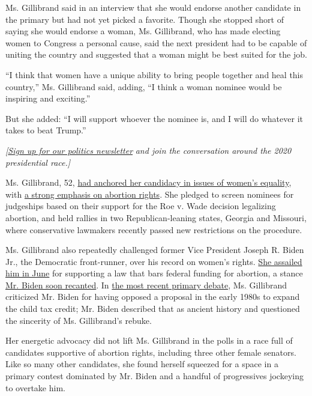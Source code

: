 Ms. Gillibrand said in an interview that she would endorse another
candidate in the primary but had not yet picked a favorite. Though she
stopped short of saying she would endorse a woman, Ms. Gillibrand, who
has made electing women to Congress a personal cause, said the next
president had to be capable of uniting the country and suggested that a
woman might be best suited for the job.

``I think that women have a unique ability to bring people together and
heal this country,'' Ms. Gillibrand said, adding, ``I think a woman
nominee would be inspiring and exciting.''

But she added: ``I will support whoever the nominee is, and I will do
whatever it takes to beat Trump.''

\emph{{[}}\href{https://www.nytimes.com/newsletters/politics?smid=rd?action=click\&module=Intentional\&pgtype=Article}{\emph{Sign
up for our politics newsletter}} \emph{and join the conversation around
the 2020 presidential race.{]}}

Ms. Gillibrand, 52,
\href{https://www.nytimes.com/2019/05/22/us/politics/gillibrand-family-bill-of-rights.html}{had
anchored her candidacy in issues of women's equality}, with
\href{https://www.nytimes.com/2019/05/17/us/politics/kirsten-gillibrand-abortion.html}{a
strong emphasis on abortion rights}. She pledged to screen nominees for
judgeships based on their support for the Roe v. Wade decision
legalizing abortion, and held rallies in two Republican-leaning states,
Georgia and Missouri, where conservative lawmakers recently passed new
restrictions on the procedure.

Ms. Gillibrand also repeatedly challenged former Vice President Joseph
R. Biden Jr., the Democratic front-runner, over his record on women's
rights.
\href{https://www.nytimes.com/2019/06/05/us/politics/biden-hyde-amendment.html}{She
assailed him in June} for supporting a law that bars federal funding for
abortion, a stance
\href{https://www.nytimes.com/2019/06/06/us/politics/joe-biden-hyde-amendment.html}{Mr.
Biden soon recanted}. In
\href{https://www.nytimes.com/2019/07/31/us/politics/democratic-presidential-debate-recap.html}{the
most recent primary debate}, Ms. Gillibrand criticized Mr. Biden for
having opposed a proposal in the early 1980s to expand the child tax
credit; Mr. Biden described that as ancient history and questioned the
sincerity of Ms. Gillibrand's rebuke.

Her energetic advocacy did not lift Ms. Gillibrand in the polls in a
race full of candidates supportive of abortion rights, including three
other female senators. Like so many other candidates, she found herself
squeezed for a space in a primary contest dominated by Mr. Biden and a
handful of progressives jockeying to overtake him.

